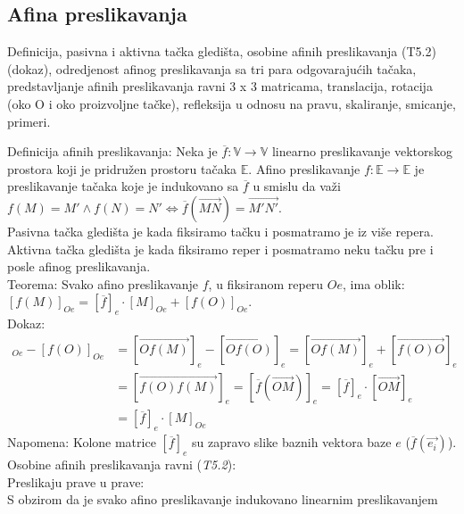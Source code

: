 \documentclass[12pt]{article}
\newcommand{\vek}[1]{\overrightarrow{#1}}
\begin{document}
    \subsection{Afina preslikavanja}
    Definicija, pasivna i aktivna tačka gledišta, osobine afinih
    preslikavanja (T5.2) (dokaz), odredjenost afinog
    preslikavanja sa tri para odgovarajućih tačaka,
    predstavljanje afinih preslikavanja ravni 3 x 3 matricama,
    translacija, rotacija (oko O i oko proizvoljne tačke), refleksija
    u odnosu na pravu, skaliranje, smicanje, primeri.
    \par

    \vspace*{1cm}

    Definicija afinih preslikavanja: Neka je $\overline{f}: \mathbb{V}\rightarrow\mathbb{V}$
    linearno preslikavanje vektorskog prostora koji je pridružen prostoru
    tačaka $\mathbb{E}$. Afino preslikavanje $f: \mathbb{E}\rightarrow\mathbb{E}$
    je preslikavanje tačaka koje je indukovano sa $\overline{f}$ u smislu
    da važi $f(M)=M'\land f(N)=N' \iff \overline{f}(\vek{MN})=\vek{M'N'}$.\\
    Pasivna tačka gledišta je kada fiksiramo tačku i posmatramo je iz više repera.\\
    Aktivna tačka gledišta je kada fiksiramo reper i posmatramo neku tačku pre i posle afinog preslikavanja.\\
    Teorema: Svako afino preslikavanje $f$, u fiksiranom reperu $Oe$, ima oblik:\\
$[f(M)]_{Oe}=[\overline{f}]_{e}\cdot[M]_{Oe}+[f(O)]_{Oe}$.\\
    Dokaz:
    \begin{align*}
        [f(M)]_{Oe}-[f(O)]_{Oe} & =[\vek{Of(M)}]_e-[\vek{Of(O)}]_e =[\vek{Of(M)}]_e+[\vek{f(O)O}]_e                 \\
                                & =[\vek{f(O)f(M)}]_e=[\overline{f}(\vek{OM})]_e =[\overline{f}]_e\cdot[\vek{OM}]_e \\
                                & =[\overline{f}]_e\cdot[M]_{Oe}
    \end{align*}
    Napomena: Kolone matrice $[\overline{f}]_e$ su zapravo slike baznih vektora baze $e$ ($\overline{f}(\vek{e_i})$).\\
    Osobine afinih preslikavanja ravni (\textit{T5.2}):\\
    Preslikaju prave u prave:\\
    S obzirom da je svako afino preslikavanje indukovano linearnim preslikavanjem
\end{document}
